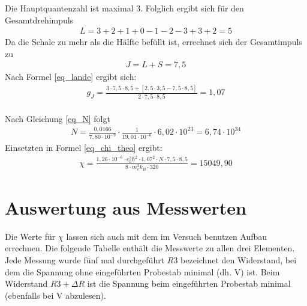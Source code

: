 Die Hauptquantenzahl ist maximal 3. Folglich ergibt sich für den Gesamtdrehimpuls
\begin{align*}
L= 3+2+1+0-1-2-3+3+2=5
\end{align*} 
Da die Schale zu mehr als die Hälfte befüllt ist, errechnet sich der Gesamtimpuls zu 
\begin{align*}
J=L+S=7,5
\end{align*}
Nach Formel \eqref{eq_lande} ergibt sich:
\begin{align}
g_J=\frac{3\cdot7,5\cdot8,5+[2,5\cdot3,5-7,5\cdot8,5]}{2\cdot 7,5\cdot8,5}=1,07
\end{align}\\
Nach Gleichung \eqref{eq_N} folgt
\begin{align}
	N=\frac{0,0166}{7,80\cdot10^{-9}}\cdot\frac{1}	{19,01\cdot10^{-6}}\cdot6,02\cdot10^{23}=6,74\cdot10^{34}
\end{align}
Einsetzten in Formel \eqref{eq_chi_theo} ergibt:
\begin{align}
\chi= \frac{1,26\cdot 10^{-6}\cdot e_0^2\hbar^2\cdot 1,07^2 \cdot N\cdot 7,5\cdot 8,5}{8\cdot m_e^2 k_B\cdot320}=15049,90
\end{align}

\section{Auswertung aus Messwerten}
Die Werte für $\chi$ lassen sich auch mit dem im Versuch benutzen Aufbau errechnen. Die folgende Tabelle enthält die Messwerte zu allen drei Elementen. Jede Messung wurde fünf mal durchgeführt $R3$ bezeichnet den Widerstand, bei dem die Spannung ohne eingeführten Probestab minimal (dh. V) ist. Beim Widerstand $R3 + \Delta R$ ist die Spannung beim eingeführten Probestab minimal (ebenfalls bei V abzulesen).

